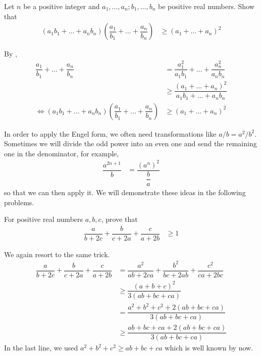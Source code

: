 \documentclass{subfile}
\begin{document}
		\begin{problem}
			Let $n$ be a positive integer and $a_{1},\ldots,a_{n};b_{1},\ldots,b_{n}$ be positive real numbers. Show that
				\begin{align*}
					(a_{1}b_{1}+\ldots+a_{n}b_{n})\left(\dfrac{a_{1}}{b_{1}}+\ldots+\dfrac{a_{n}}{b_{n}}\right)
						& \geq (a_{1}+\ldots+a_{n})^{2}
				\end{align*}
			
				\begin{solution}
					By ,
						\begin{align*}
							\dfrac{a_{1}}{b_{1}}+\ldots+\dfrac{a_{n}}{b_{n}}
								& = \dfrac{a_{1}^{2}}{a_{1}b_{1}}+\ldots+\dfrac{a_{n}^{2}}{a_{n}b_{n}}\\
								& \geq \dfrac{(a_{1}+\ldots+a_{n})^{2}}{a_{1}b_{1}+\ldots+a_{n}b_{n}}\\
							\iff (a_{1}b_{1}+\ldots+a_{n}b_{n})\left(\dfrac{a_{1}}{b_{1}}+\ldots+\dfrac{a_{n}}{b_{n}}\right)
								& \geq (a_{1}+\ldots+a_{n})^{2}
						\end{align*}
				\end{solution}
		\end{problem}
	
		\begin{remark}
			In order to apply the Engel form, we often need transformations like $a/b=a^{2}/b^{2}$. Sometimes we will divide the odd power into an even one and send the remaining one in the denominator, for example,
				\begin{align*}
					\dfrac{a^{2n+1}}{b}
						& = \dfrac{\left(a^{n}\right)^{2}}{\dfrac{b}{a}}
				\end{align*}
			so that we can then apply it. We will demonstrate these ideas in the following problems.
		\end{remark}
	
		\begin{problem}
			For positive real numbers $a,b,c$, prove that
				\begin{align*}
					\dfrac{a}{b+2c}+\dfrac{b}{c+2a}+\dfrac{c}{a+2b}
						& \geq 1
				\end{align*}
			
				\begin{solution}
					We again resort to the same trick.
						\begin{align*}
							\dfrac{a}{b+2c}+\dfrac{b}{c+2a}+\dfrac{c}{a+2b}
								& = \dfrac{a^{2}}{ab+2ca}+\dfrac{b^{2}}{bc+2ab}+\dfrac{c^{2}}{ca+2bc}\\
								& \geq \dfrac{(a+b+c)^{2}}{3(ab+bc+ca)}\\
								& = \dfrac{a^{2}+b^{2}+c^{2}+2(ab+bc+ca)}{3(ab+bc+ca)}\\
								& \geq \dfrac{ab+bc+ca+2(ab+bc+ca)}{3(ab+bc+ca)}
						\end{align*}
					In the last line, we used $a^{2}+b^{2}+c^{2}\geq ab+bc+ca$ which is well known by now.
				\end{solution}
		\end{problem}
	
\end{document}
